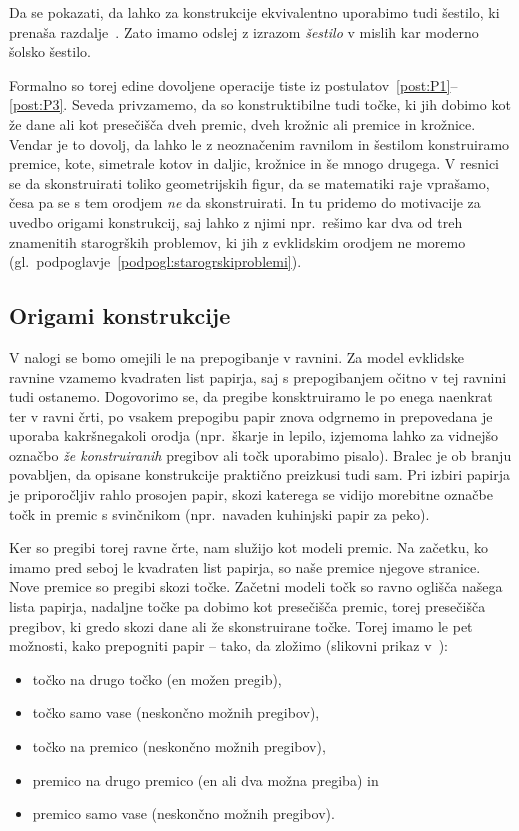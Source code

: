 \begin{opomba}
    Da se pokazati, da lahko za konstrukcije ekvivalentno uporabimo tudi šestilo, ki prenaša razdalje~\cite[str.\ 6--7]{geometricconstructions}. Zato imamo odslej z izrazom \emph{šestilo} v mislih kar moderno šolsko šestilo.
\end{opomba}

Formalno so torej edine dovoljene operacije tiste iz postulatov~\ref{post:P1}--\ref{post:P3}. Seveda privzamemo, da so konstruktibilne tudi točke, ki jih dobimo kot že dane ali kot presečišča dveh premic, dveh krožnic ali premice in krožnice. Vendar je to dovolj, da lahko le z neoznačenim ravnilom in šestilom konstruiramo premice, kote, simetrale kotov in daljic, krožnice in še mnogo drugega. V resnici se da skonstruirati toliko geometrijskih figur, da se matematiki raje vprašamo, česa pa se s tem orodjem \emph{ne} da skonstruirati. In tu pridemo do motivacije za uvedbo origami konstrukcij, saj lahko z njimi npr.\ rešimo kar dva od treh znamenitih starogrških problemov, ki jih z evklidskim orodjem ne moremo (gl.\ podpoglavje~\ref{podpogl:starogrskiproblemi}).

\subsection{Origami konstrukcije}
\label{origami_konstrukcije}

V nalogi se bomo omejili le na prepogibanje v ravnini. Za model evklidske ravnine vzamemo kvadraten list papirja, saj s prepogibanjem očitno v tej ravnini tudi ostanemo. Dogovorimo se, da pregibe konsktruiramo le po enega naenkrat ter v ravni črti, po vsakem prepogibu papir znova odgrnemo in prepovedana je uporaba kakršnegakoli orodja (npr.\ škarje in lepilo, izjemoma lahko za vidnejšo označbo \emph{že konstruiranih} pregibov ali točk uporabimo pisalo).  Bralec je ob branju povabljen, da opisane konstrukcije praktično preizkusi tudi sam. Pri izbiri papirja je priporočljiv rahlo prosojen papir, skozi katerega se vidijo morebitne označbe točk in premic s svinčnikom (npr.\ navaden kuhinjski papir za peko).

Ker so pregibi torej ravne črte, nam služijo kot modeli premic. Na začetku, ko imamo pred seboj le kvadraten list papirja, so naše premice njegove stranice. Nove premice so pregibi skozi točke. Začetni modeli točk so ravno oglišča našega lista papirja, nadaljne točke pa dobimo kot presečišča premic, torej presečišča pregibov, ki gredo skozi dane ali že skonstruirane točke. Torej imamo le pet možnosti, kako prepogniti papir -- tako, da zložimo (slikovni prikaz v~\cite[str.\ 25--26]{hull2020}):
\begin{itemize}
    \item točko na drugo točko (en možen pregib),
    \item točko samo vase (neskončno možnih pregibov),
    \item točko na premico (neskončno možnih pregibov),
    \item premico na drugo premico (en ali dva možna pregiba) in
    \item premico samo vase (neskončno možnih pregibov).
\end{itemize}

